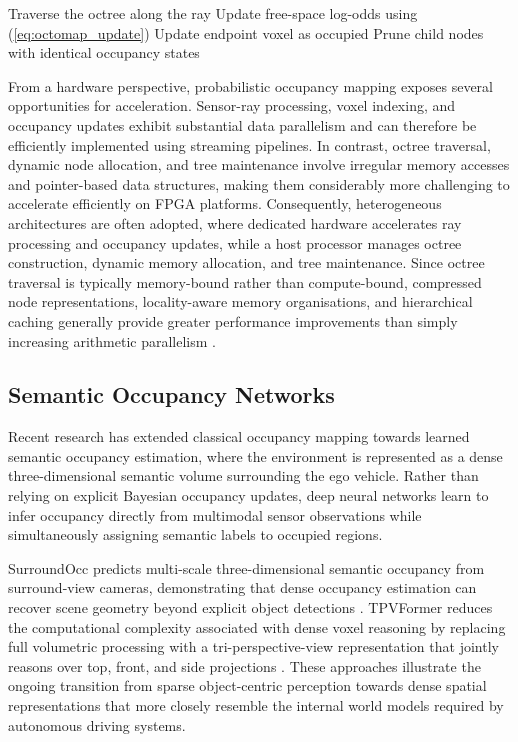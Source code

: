\documentclass[11pt,oneside,openany]{book}
\begin{document}
\begin{algorithm}[t]
\caption{Incremental Probabilistic OctoMap Update}
\label{alg:octomap_update}
\begin{algorithmic}[1]
    \State Traverse the octree along the ray
        \State Update free-space log-odds using (\ref{eq:octomap_update})
    \EndFor
    \State Update endpoint voxel as occupied
\EndFor
\State Prune child nodes with identical occupancy states
\end{algorithmic}
\end{algorithm}

From a hardware perspective, probabilistic occupancy mapping exposes several opportunities for acceleration. Sensor-ray processing, voxel indexing, and occupancy updates exhibit substantial data parallelism and can therefore be efficiently implemented using streaming pipelines. In contrast, octree traversal, dynamic node allocation, and tree maintenance involve irregular memory accesses and pointer-based data structures, making them considerably more challenging to accelerate efficiently on FPGA platforms. Consequently, heterogeneous architectures are often adopted, where dedicated hardware accelerates ray processing and occupancy updates, while a host processor manages octree construction, dynamic memory allocation, and tree maintenance. Since octree traversal is typically memory-bound rather than compute-bound, compressed node representations, locality-aware memory organisations, and hierarchical caching generally provide greater performance improvements than simply increasing arithmetic parallelism \cite{jia2022_omu}.

\subsection{Semantic Occupancy Networks}

Recent research has extended classical occupancy mapping towards learned semantic occupancy estimation, where the environment is represented as a dense three-dimensional semantic volume surrounding the ego vehicle. Rather than relying on explicit Bayesian occupancy updates, deep neural networks learn to infer occupancy directly from multimodal sensor observations while simultaneously assigning semantic labels to occupied regions.

SurroundOcc predicts multi-scale three-dimensional semantic occupancy from surround-view cameras, demonstrating that dense occupancy estimation can recover scene geometry beyond explicit object detections \cite{wei2023_surroundocc}. TPVFormer reduces the computational complexity associated with dense voxel reasoning by replacing full volumetric processing with a tri-perspective-view representation that jointly reasons over top, front, and side projections \cite{huang2023_tpvformer}. These approaches illustrate the ongoing transition from sparse object-centric perception towards dense spatial representations that more closely resemble the internal world models required by autonomous driving systems.
\end{document}
